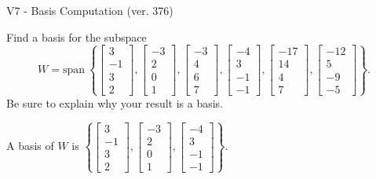 \begin{exercise}
  \begin{exerciseTitle}V7 - Basis Computation (ver. 376)\end{exerciseTitle}
  \begin{exerciseStatement}
    Find a basis for the subspace 
\[W=\mathrm{span}\ \left\{\left[\begin{array}{r}
3 \\
-1 \\
3 \\
2
\end{array}\right] , \left[\begin{array}{r}
-3 \\
2 \\
0 \\
1
\end{array}\right] , \left[\begin{array}{r}
-3 \\
4 \\
6 \\
7
\end{array}\right] , \left[\begin{array}{r}
-4 \\
3 \\
-1 \\
-1
\end{array}\right] , \left[\begin{array}{r}
-17 \\
14 \\
4 \\
7
\end{array}\right] , \left[\begin{array}{r}
-12 \\
5 \\
-9 \\
-5
\end{array}\right]\right\}.\]
 Be sure to explain why your result is a basis.


  \end{exerciseStatement}
  \begin{exerciseAnswer}
   A basis of \(W\) is  \(\left\{\left[\begin{array}{r}
3 \\
-1 \\
3 \\
2
\end{array}\right] , \left[\begin{array}{r}
-3 \\
2 \\
0 \\
1
\end{array}\right] , \left[\begin{array}{r}
-4 \\
3 \\
-1 \\
-1
\end{array}\right]\right\}\).
  


  \end{exerciseAnswer}
\end{exercise}
